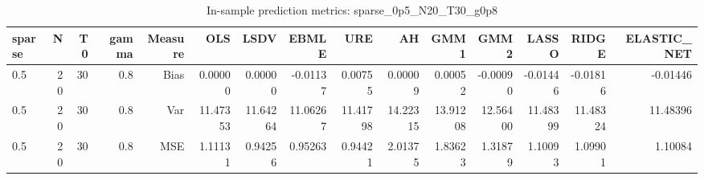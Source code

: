 \begin{table}[!htbp]\centering
\caption{In-sample prediction metrics: sparse_0p5_N20_T30_g0p8}
\label{tab:table2_sparse_0p5_N20_T30_g0p8}
\begin{tabular}{lrrrrrrrrrrrrrr}
\hline
sparse & N & T0 & gamma & Measure & OLS & LSDV & EBMLE & URE & AH & GMM1 & GMM2 & LASSO & RIDGE & ELASTIC_NET \\
\hline
0.5 & 20 & 30 & 0.8 & Bias & 0.00000 & 0.00000 & -0.01137 & 0.00755 & 0.00009 & 0.00052 & -0.00090 & -0.01446 & -0.01816 & -0.01446 \\
0.5 & 20 & 30 & 0.8 & Var & 11.47353 & 11.64264 & 11.06267 & 11.41798 & 14.22315 & 13.91208 & 12.56400 & 11.48399 & 11.48324 & 11.48396 \\
0.5 & 20 & 30 & 0.8 & MSE & 1.11131 & 0.94256 & 0.95263 & 0.94421 & 2.01375 & 1.83623 & 1.31879 & 1.10093 & 1.09901 & 1.10084 \\
\hline
\end{tabular}
\end{table}

